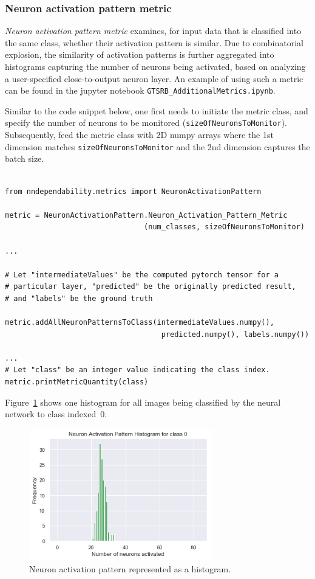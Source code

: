 \documentclass{article}
\begin{document}
\subsubsection{Neuron activation pattern metric}

\emph{Neuron activation pattern metric} examines, for input data that is classified into the same class, whether their activation pattern is similar. Due to combinatorial explosion, the similarity of activation patterns is further aggregated into histograms capturing the number of neurons being activated, based on analyzing a user-specified close-to-output neuron layer. An example of using such a metric can be found in the jupyter notebook \texttt{GTSRB\_AdditionalMetrics.ipynb}.

Similar to the code snippet below, one first needs to initiate the metric class, and specify the number of neurons to be monitored (\texttt{sizeOfNeuronsToMonitor}). Subsequently, feed the metric class with 2D numpy arrays where the 1st dimension matches \texttt{sizeOfNeuronsToMonitor} and the 2nd dimension captures the batch size.  

\begin{small}
\color{blue}
\begin{verbatim}

from nndependability.metrics import NeuronActivationPattern

metric = NeuronActivationPattern.Neuron_Activation_Pattern_Metric
                                (num_classes, sizeOfNeuronsToMonitor)

...

# Let "intermediateValues" be the computed pytorch tensor for a 
# particular layer, "predicted" be the originally predicted result,
# and "labels" be the ground truth

metric.addAllNeuronPatternsToClass(intermediateValues.numpy(),
                                    predicted.numpy(), labels.numpy())

...
# Let "class" be an integer value indicating the class index.
metric.printMetricQuantity(class)

\end{verbatim}
\end{small}

Figure~\ref{fig.histogram} shows one histogram for all images being classified by the neural network to class indexed~$0$. 

\begin{figure}[ht]
\centering
\includegraphics[width=8cm]{fig/ActivationPattern.png}
\caption{Neuron activation pattern represented as a histogram.}
\label{fig.histogram}
\end{figure}
\end{document}
